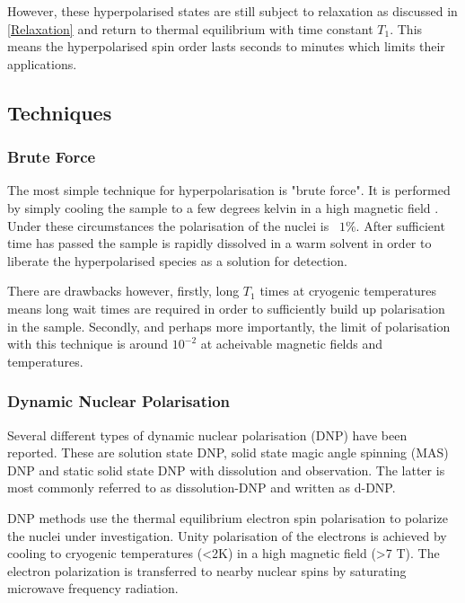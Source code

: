  However, these hyperpolarised states are still subject to relaxation as discussed in \ref{Relaxation} and
 return to thermal equilibrium with time constant $T_1$. This means the hyperpolarised spin order lasts seconds
 to minutes which limits their applications.

 \subsection{Techniques}

 \subsubsection{Brute Force}

 The most simple technique for hyperpolarisation is "brute force". It is performed by simply
 cooling the sample to a few degrees kelvin in a high magnetic field \citep{RN155,RN157}. Under
 these circumstances the polarisation of the nuclei is ~$1\%$. After sufficient time has passed
 the sample is rapidly dissolved in a warm solvent in order to liberate the hyperpolarised
 species as a solution for detection.

 There are drawbacks however, firstly, long $T_1$ times at cryogenic temperatures means long
 wait times are required in order to sufficiently build up polarisation in the sample. Secondly, and
 perhaps more importantly, the limit of polarisation with this technique is around $10^{-2}$ at acheivable
 magnetic fields and temperatures.

 \subsubsection{Dynamic Nuclear Polarisation}

 Several different types of dynamic nuclear polarisation (DNP) have been reported. These are solution
 state DNP\citep{RN158}, solid state magic angle spinning (MAS) DNP\citep{RN159} and static solid state DNP with
 dissolution and observation\citep{RN160}. The latter is most commonly referred to as dissolution-DNP and written as d-DNP.

 DNP methods use the thermal equilibrium electron spin polarisation to polarize the nuclei under investigation. Unity
 polarisation of the electrons is achieved by cooling to cryogenic temperatures (<2K) in a high magnetic field (>7 T).
 The electron polarization is transferred to nearby nuclear spins by saturating microwave frequency radiation.

